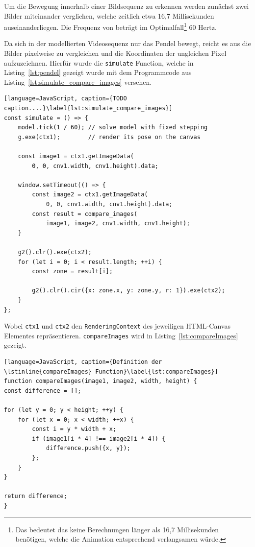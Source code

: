 Um die Bewegung innerhalb einer Bildsequenz zu erkennen werden zunächst zwei Bilder miteinander verglichen, welche zeitlich etwa 16,7 Millisekunden auseinanderliegen.
Die Frequenz von  beträgt im Optimalfall\footnote{Das bedeutet das keine Berechnungen länger als 16,7 Millisekunden benötigen, welche die Animation entsprechend verlangsamen würde.} 60 Hertz.

Da sich in der modellierten Videosequenz nur das Pendel bewegt, reicht es aus die Bilder pixelweise zu vergleichen und die Koordinaten der ungleichen Pixel aufzuzeichnen.
Hierfür wurde die \lstinline{simulate} Function, welche in Listing~\ref{lst:pendel} gezeigt wurde mit dem Programmcode aus Listing~\ref{lst:simulate_compare_images} versehen.

\begin{lstlisting}[language=JavaScript, caption={TODO caption....}\label{lst:simulate_compare_images}]
const simulate = () => {
    model.tick(1 / 60); // solve model with fixed stepping
    g.exe(ctx1);        // render its pose on the canvas

    const image1 = ctx1.getImageData(
        0, 0, cnv1.width, cnv1.height).data;

    window.setTimeout(() => {
        const image2 = ctx1.getImageData(
            0, 0, cnv1.width, cnv1.height).data;
        const result = compare_images(
            image1, image2, cnv1.width, cnv1.height);
    }

    g2().clr().exe(ctx2);
    for (let i = 0; i < result.length; ++i) {
        const zone = result[i];

        g2().clr().cir({x: zone.x, y: zone.y, r: 1}).exe(ctx2);
    }
};
\end{lstlisting}

Wobei \lstinline{ctx1} und \lstinline{ctx2} den \lstinline{RenderingContext} des jeweiligen HTML-Canvas Elementes repräsentieren.
\lstinline{compareImages} wird in Listing~\ref{lst:compareImages} gezeigt.

\begin{lstlisting}[language=JavaScript, caption={Definition der \lstinline{compareImages} Function}\label{lst:compareImages}]
function compareImages(image1, image2, width, height) {
const difference = [];

for (let y = 0; y < height; ++y) {
    for (let x = 0; x < width; ++x) {
        const i = y * width + x;
        if (image1[i * 4] !== image2[i * 4]) {
            difference.push({x, y});
        };
    }
}

return difference;
}
\end{lstlisting}


